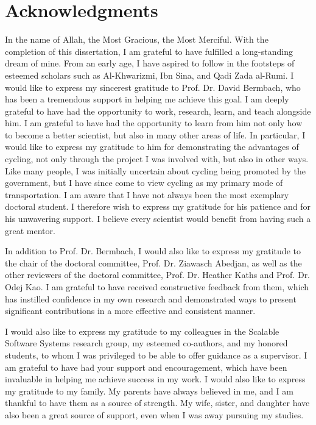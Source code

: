
\cleardoublepage
{}
\section*{Acknowledgments}
In the name of Allah, the Most Gracious, the Most Merciful.
With the completion of this dissertation, I am grateful to have fulfilled a long-standing dream of mine.
From an early age, I have aspired to follow in the footsteps of esteemed scholars such as Al-Khwarizmi, Ibn Sina, and Qadi Zada al-Rumi.
I would like to express my sincerest gratitude to Prof. Dr. David Bermbach, who has been a tremendous support in helping me achieve this goal.
I am deeply grateful to have had the opportunity to work, research, learn, and teach alongside him.
I am grateful to have had the opportunity to learn from him not only how to become a better scientist, but also in many other areas of life.
In particular, I would like to express my gratitude to him for demonstrating the advantages of cycling, not only through the project I was involved with, but also in other ways.
Like many people, I was initially uncertain about cycling being promoted by the government, but I have since come to view cycling as my primary mode of transportation.
I am aware that I have not always been the most exemplary doctoral student.
I therefore wish to express my gratitude for his patience and for his unwavering support.
I believe every scientist would benefit from having such a great mentor.

In addition to Prof. Dr. Bermbach, I would also like to express my gratitude to the chair of the doctoral committee, Prof. Dr. Ziawasch Abedjan, as well as the other reviewers of the doctoral committee, Prof. Dr. Heather Kaths and Prof. Dr. Odej Kao.
I am grateful to have received constructive feedback from them, which has instilled confidence in my own research and demonstrated ways to present significant contributions in a more effective and consistent manner.

I would also like to express my gratitude to my colleagues in the Scalable Software Systems research group, my esteemed co-authors, and my honored students, to whom I was privileged to be able to offer guidance as a supervisor.
I am grateful to have had your support and encouragement, which have been invaluable in helping me achieve success in my work.
I would also like to express my gratitude to my family. My parents have always believed in me, and I am thankful to have them as a source of strength.
My wife, sister, and daughter have also been a great source of support, even when I was away pursuing my studies.

